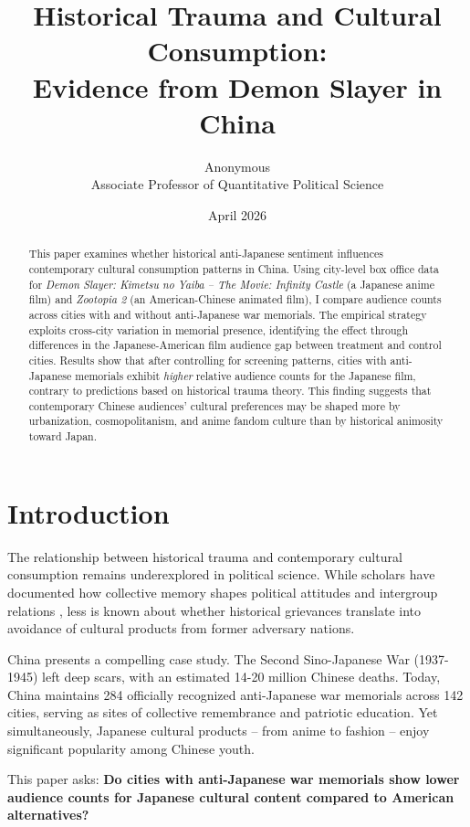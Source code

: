 \documentclass[12pt]{article}
\title{\textbf{Historical Trauma and Cultural Consumption:} \\ Evidence from Demon Slayer in China}
\author{Anonymous \\ Associate Professor of Quantitative Political Science}
\date{April 2026}
\begin{document}
\maketitle

\begin{abstract}
This paper examines whether historical anti-Japanese sentiment influences contemporary cultural consumption patterns in China. Using city-level box office data for \textit{Demon Slayer: Kimetsu no Yaiba -- The Movie: Infinity Castle} (a Japanese anime film) and \textit{Zootopia 2} (an American-Chinese animated film), I compare audience counts across cities with and without anti-Japanese war memorials. The empirical strategy exploits cross-city variation in memorial presence, identifying the effect through differences in the Japanese-American film audience gap between treatment and control cities. Results show that after controlling for screening patterns, cities with anti-Japanese memorials exhibit \textit{higher} relative audience counts for the Japanese film, contrary to predictions based on historical trauma theory. This finding suggests that contemporary Chinese audiences' cultural preferences may be shaped more by urbanization, cosmopolitanism, and anime fandom culture than by historical animosity toward Japan.
\end{abstract}

\section{Introduction}

The relationship between historical trauma and contemporary cultural consumption remains underexplored in political science. While scholars have documented how collective memory shapes political attitudes and intergroup relations \citep{halbwachs1992memory, assmann2011cultural}, less is known about whether historical grievances translate into avoidance of cultural products from former adversary nations.

China presents a compelling case study. The Second Sino-Japanese War (1937-1945) left deep scars, with an estimated 14-20 million Chinese deaths. Today, China maintains 284 officially recognized anti-Japanese war memorials across 142 cities, serving as sites of collective remembrance and patriotic education. Yet simultaneously, Japanese cultural products -- from anime to fashion -- enjoy significant popularity among Chinese youth.

This paper asks: \textbf{Do cities with anti-Japanese war memorials show lower audience counts for Japanese cultural content compared to American alternatives?}
\end{document}
